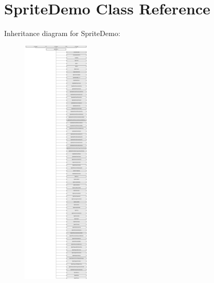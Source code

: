 \hypertarget{interface_sprite_demo}{\section{Sprite\-Demo Class Reference}
\label{interface_sprite_demo}
}
Inheritance diagram for Sprite\-Demo\-:\begin{figure}[H]
\begin{center}
\leavevmode
\includegraphics[height=12.000000cm]{interface_sprite_demo}
\end{center}
\end{figure}
